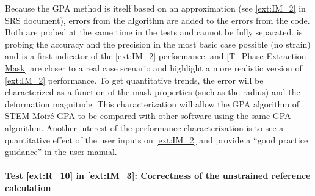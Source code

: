 \documentclass[12pt, titlepage]{article}
\newcommand{\progname}{STEM Moir{\'e} GPA}
\begin{document}
Because the GPA method is itself based on an approximation (see \cref{ext:IM_2} in SRS document), errors from the algorithm are added to the errors from the code. Both are probed at the same time in the tests and cannot be fully separated.  is probing the accuracy and the precision in the most basic case possible (no strain) and is a first indicator of the \cref{ext:IM_2} performance.  and \cref{T_Phase-Extraction-Mask} are closer to a real case scenario and highlight a more realistic version of \cref{ext:IM_2} performance. To get quantitative trends, the error will be characterized as a function of the mask properties (such as the radius) and the deformation magnitude. This characterization will allow the GPA algorithm of \progname{} to be compared with other software using the same GPA algorithm. Another interest of the performance characterization is to see a quantitative effect of the user inputs on \cref{ext:IM_2} and provide a ``good practice guidance'' in the user manual.

\paragraph{Test \cref{ext:R_10} in \cref{ext:IM_3}: Correctness of the unstrained reference calculation}	
\end{document}
